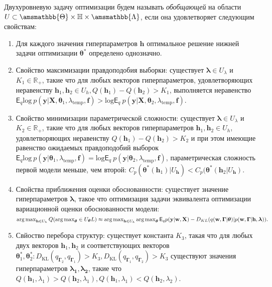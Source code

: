 \begin{defin}
Двухуровневую задачу оптимизации будем называть \textit{обобщающей} на области $U \subset \amsmathbb{\Theta} \times \mathbb{H} \times \amsmathbb{\Lambda}$, если она удовлетворяет следующим свойствам:
\begin{enumerate}
\item Для каждого значения гиперпараметров $\mathbf{h}$ оптимальное решение нижней задачи оптимизации $\boldsymbol{\theta}^{*}$ определено однозначно.

\item Свойство максимизации правдоподобия выборки: существует $\boldsymbol{\lambda} \in U_{\lambda}$ и  $K_1 \in \mathbb{R}_{+}$, такие что для любых векторов гиперпараметров, удовлетворяющих неравенству $\mathbf{h}_1, \mathbf{h}_2 \in  U_{h}, Q(\mathbf{h}_1) - Q(\mathbf{h}_2) > K_1$, выполняется неравенство $\mathsf{E}_q \text{log}~p(\mathbf{y}|\mathbf{X}, \boldsymbol{\theta}_1, \lambda_{\text{temp}}, \mathbf{f})>\text{log}\mathsf{E}_q ~p(\mathbf{y}|\mathbf{X}, \boldsymbol{\theta}_2, \lambda_{\text{temp}}, \mathbf{f})$.

\item Свойство минимизации параметрической сложности:  существует  $\boldsymbol{\lambda} \in U_{\lambda}$ и $K_2 \in \mathbb{R}_{+}$, такие что для любых векторов гиперпараметров $\mathbf{h}_1, \mathbf{h}_2 \in U_h$, удовлетворяющих неравенству $Q(\mathbf{h}_1) - Q(\mathbf{h}_2) > K_2$ и при этом имеющие равенство ожидаемых правдоподобий выборок  $\mathsf{E}_q \text{log}~p(\mathbf{y}|\boldsymbol{\theta}_1, \lambda_{\text{temp}}, \mathbf{f}) = \text{log}\mathsf{E}_q ~p(\mathbf{y}|\boldsymbol{\theta}_2, \lambda_{\text{temp}}, \mathbf{f})$, параметрическая сложность первой модели меньше, чем второй: $C_p(\boldsymbol{\theta}^{*}(\mathbf{h}_1)|U_\mathbf{h})<C_p(\boldsymbol{\theta}^{*}(\mathbf{h}_2|U_\mathbf{h})$.

\item Свойства приближения оценки обоснованности: существует значение гиперпараметров $\boldsymbol{\lambda}$, такое что оптимизация задачи эквивалента оптимизации вариационной оценки обоснованности модели: $\operatorname*{arg\,max}_{\mathbf{h} \in U_h}Q(\operatorname*{arg\,max}_{\boldsymbol{\theta}} \in U_{\boldsymbol{\theta}} L) \approx \operatorname*{arg\,max}_{\mathbf{h} \in U_h}\operatorname*{arg\,max}_{\boldsymbol{\theta}} \mathsf{E}_q p(\mathbf{y}|\mathbf{w}, \mathbf{X}) - {D}_{KL}(q(\mathbf{w}, \boldsymbol{\Gamma}|\boldsymbol{\theta})|p(\mathbf{w}, \boldsymbol{\Gamma}|\mathbf{h}, \boldsymbol{\lambda})).$

\item Свйоство перебора структур: существует константа $K_3$, такая что для любых двух векторов $\mathbf{h}_{1}, \mathbf{h}_2$ и соответствующих векторов $\boldsymbol{\theta}_1^{*},\boldsymbol{\theta}_2^{*}: D_\text{KL}(q_{\boldsymbol{\Gamma}_2}, q_{\boldsymbol{\Gamma}_1})>K_3, D_\text{KL}(q_{\boldsymbol{\Gamma}_1}, q_{\boldsymbol{\Gamma}_2})>K_3$  существуют значения гиперпараметров $\boldsymbol{\lambda_1},\boldsymbol{\lambda_2}$, такие что  $Q(\mathbf{h}_1, \lambda_1) > Q(\mathbf{h}_2, \lambda_1), Q(\mathbf{h}_1, \lambda_1) < Q(\mathbf{h}_2, \lambda_2)$.


\end{enumerate}
\end{defin}
